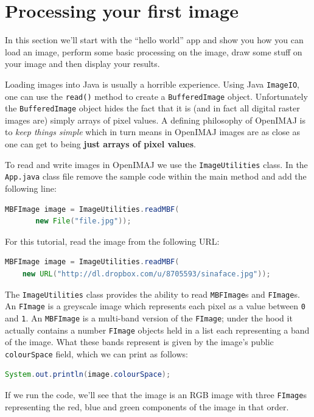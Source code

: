 \chapter{Processing your first image}
In this section we'll start with the ``hello world'' app and show you how you can load an image, 
perform some basic processing on the image, draw some stuff on your image and then display your 
results.

Loading images into Java is usually a horrible experience. Using Java \verb+ImageIO+, one can use the 
\verb+read()+ method to create a \verb+BufferedImage+ object. Unfortunately the \verb+BufferedImage+ 
object hides the fact that it is (and in fact all digital raster images are) simply arrays of pixel 
values. A defining philosophy of OpenIMAJ is to \emph{keep things simple} which in turn means in OpenIMAJ 
images are as close as one can get to being \textbf{just arrays of pixel values}.

To read and write images in OpenIMAJ we use the \verb+ImageUtilities+ class. In the \verb+App.java+ 
class file remove the sample code within the main method and add the following line:
\begin{lstlisting}[language=java]
MBFImage image = ImageUtilities.readMBF(
       new File("file.jpg"));
\end{lstlisting}
For this tutorial, read the image from the following URL:
\begin{lstlisting}[language=java]
MBFImage image = ImageUtilities.readMBF(
    new URL("http://dl.dropbox.com/u/8705593/sinaface.jpg"));
\end{lstlisting}
The \verb+ImageUtilities+ class provides the ability to read \verb+MBFImage+s and \verb+FImage+s. 
An \verb+FImage+ is a greyscale image which represents each pixel as a value between \verb+0+ and 
\verb+1+. An \verb+MBFImage+ is a multi-band version of the \verb+FImage+; under the hood it actually
contains a number \verb+FImage+ objects held in a list each representing a band of the image. 
What these bands represent is given by the image's public \verb+colourSpace+ field, which we 
can print as follows:
\begin{lstlisting}[language=java]
System.out.println(image.colourSpace);
\end{lstlisting}
If we run the code, we'll see that the image is an RGB image with three \verb+FImage+s representing 
the red, blue and green components of the image in that order.

